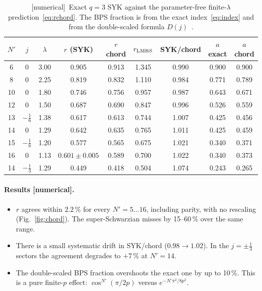 \documentclass[11pt]{article}
\newcommand{\Np}{N'}
\newcommand{\tagbox}[2]{\textsf{\small\color{#1}[#2]}}
\newcommand{\NUM}{\tagbox{cnum}{numerical}}
\theoremstyle{remark}
\begin{document}
\begin{table}[h]\centering\small
\begin{tabular}{@{}ccc cccc cc@{}}\toprule
$\Np$ & $j$ & $\lambda$ & $r$ (SYK) & $r$ chord & $r_{\rm LMRS}$ & SYK/chord & $a$ exact & $a$ chord\\\midrule
6 & 0 & 3.00 & 0.905 & 0.913 & 1.345 & 0.990 & 0.900 & 0.900\\
8 & 0 & 2.25 & 0.819 & 0.832 & 1.110 & 0.984 & 0.771 & 0.789\\
10 & 0 & 1.80 & 0.746 & 0.756 & 0.957 & 0.987 & 0.643 & 0.671\\
12 & 0 & 1.50 & 0.687 & 0.690 & 0.847 & 0.996 & 0.526 & 0.559\\
13 & $-\frac16$ & 1.38 & 0.617 & 0.613 & 0.744 & 1.007 & 0.425 & 0.456\\
14 & 0 & 1.29 & 0.642 & 0.635 & 0.765 & 1.011 & 0.425 & 0.459\\
15 & $-\frac16$ & 1.20 & 0.577 & 0.565 & 0.675 & 1.021 & 0.340 & 0.371\\
16 & 0 & 1.13 & $0.601\pm0.005$ & 0.589 & 0.700 & 1.022 & 0.340 & 0.373\\
14 & $-\frac13$ & 1.29 & 0.449 & 0.418 & 0.504 & 1.074 & 0.243 & 0.265\\\bottomrule
\end{tabular}
\caption{\NUM\ Exact $q=3$ SYK against the parameter-free finite-$\lambda$ prediction~\eqref{eq:rchord}. The BPS
fraction is from the exact index~\eqref{eq:index} and from the double-scaled formula $D(j)$~\cite[eq.~3.17]{BLY}.}
\label{tab:chord}
\end{table}

\paragraph{Results \NUM.}
\begin{itemize}\itemsep1pt
\item $r$ agrees within $2.2\,\%$ for every $\Np=5\ldots16$, including parity, with no rescaling
  (Fig.~\ref{fig:chord}). The super-Schwarzian misses by 15--60\,\% over the same range.
\item There is a small systematic drift in SYK/chord ($0.98\to1.02$). In the $j=\pm\frac13$ sectors the agreement
  degrades to $+7\,\%$ at $\Np=14$.
\item The double-scaled BPS fraction overshoots the exact one by up to 10\,\%. This is a pure finite-$p$ effect:
  $\cos^{\Np}(\pi/2p)$ versus $e^{-\Np\pi^2/8p^2}$.
\end{itemize}
\end{document}

